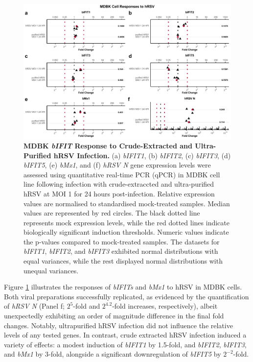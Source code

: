 \begin{figure}
    \centering
    \includegraphics[width=1\linewidth]{07. Chapter 2/Figs/02. Induction/07. mdbk_hrsv.pdf}
    \caption[MDBK \textit{bIFIT} Response to Crude-Extracted and Ultra-Purified hRSV Infection.]{\textbf{MDBK \textit{bIFIT} Response to Crude-Extracted and Ultra-Purified hRSV Infection.} (a) \textit{bIFIT1}, (b) \textit{bIFIT2}, (c) \textit{bIFIT3}, (d) \textit{bIFIT5}, (e) \textit{bMx1}, and (f) \textit{hRSV N} gene expression levels were assessed using quantitative real-time PCR (qPCR) in MDBK cell line following infection with crude-extraccted and ultra-purified hRSV at MOI 1 for 24 hours post-infection. Relative expression values are normalised to standardised mock-treated samples. Median values are represented by red circles. The black dotted line represents mock expression levels, while the red dotted lines indicate biologically significant induction thresholds. Numeric values indicate the p-values compared to mock-treated samples. The datasets for \textit{bIFIT1}, \textit{bIFIT2}, and \textit{bIFIT3} exhibited normal distributions with equal variances, while the rest displayed normal distributions with unequal variances.}
    \label{fig:bIFIT responses to hRSV infection in MDBK}
\end{figure}

Figure \ref{fig:bIFIT responses to hRSV infection in MDBK} illustrates the responses of \textit{bIFITs} and \textit{bMx1} to hRSV in MDBK cells. Both viral preparations successfully replicated, as evidenced by the quantification of \textit{hRSV N} (Panel f; \(2^{5}\)-fold and \(2^{4.2}\)-fold increases, respectively), albeit unexpectedly exhibiting an order of magnitude difference in the final fold changes. Notably, ultrapurified hRSV infection did not influence the relative levels of any tested genes. In contrast, crude extracted hRSV infection induced a variety of effects: a modest induction of \textit{bIFIT1} by 1.5-fold, and \textit{bIFIT2}, \textit{bIFIT3}, and \textit{bMx1} by 3-fold, alongside a significant downregulation of \textit{bIFIT5} by \(2^{-2}\)-fold.

